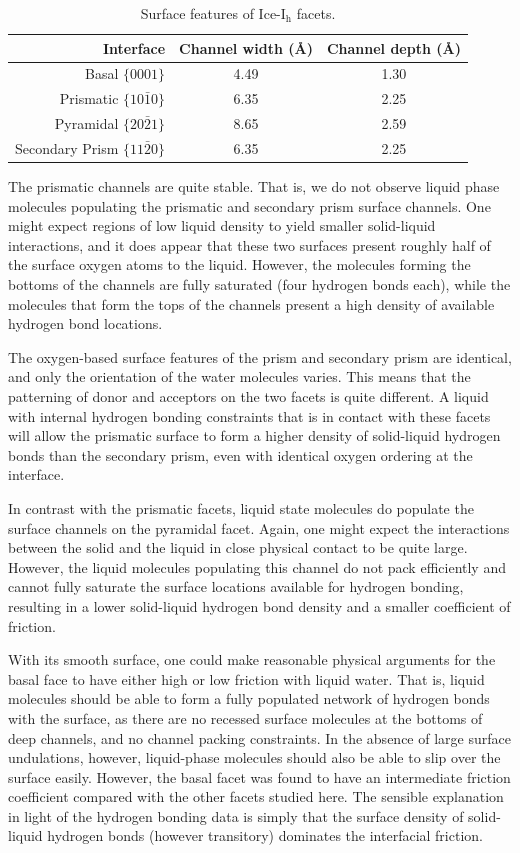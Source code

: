 \begin{table}[h]
\centering
\caption{Surface features of Ice-I$_\mathrm{h}$ facets.\label{tab:surf}}
\begin{tabular}{r|cc}  
\toprule
Interface & Channel width (\AA) & Channel depth (\AA) \\ 
\midrule
Basal  $\{0001\}$                 & 4.49 & 1.30 \\
Prismatic  $\{10\bar{1}0\}$       & 6.35 & 2.25 \\
Pyramidal  $\{20\bar{2}1\}$       & 8.65 & 2.59 \\
Secondary Prism  $\{11\bar{2}0\}$ & 6.35 & 2.25 \\ 
\bottomrule
\end{tabular}
\end{table}

The prismatic channels are quite stable. That is, we do not observe
liquid phase molecules populating the prismatic and secondary prism
surface channels. One might expect regions of low liquid density to
yield smaller solid-liquid interactions, and it does appear that these
two surfaces present roughly half of the surface oxygen atoms to the
liquid.  However, the molecules forming the bottoms of the channels
are fully saturated (four hydrogen bonds each), while the molecules
that form the tops of the channels present a high density of available
hydrogen bond locations.

The oxygen-based surface features of the prism and secondary prism are
identical, and only the orientation of the water molecules varies.
This means that the patterning of donor and acceptors on the two
facets is quite different. A liquid with internal hydrogen bonding
constraints that is in contact with these facets will allow the
prismatic surface to form a higher density of solid-liquid hydrogen
bonds than the secondary prism, even with identical oxygen ordering at
the interface.

In contrast with the prismatic facets, liquid state molecules do
populate the surface channels on the pyramidal facet. Again, one might
expect the interactions between the solid and the liquid in close
physical contact to be quite large.  However, the liquid molecules
populating this channel do not pack efficiently and cannot fully
saturate the surface locations available for hydrogen bonding,
resulting in a lower solid-liquid hydrogen bond density and a smaller
coefficient of friction.

With its smooth surface, one could make reasonable physical arguments
for the basal face to have either high or low friction with liquid
water. That is, liquid molecules should be able to form a fully
populated network of hydrogen bonds with the surface, as there are no
recessed surface molecules at the bottoms of deep channels, and no
channel packing constraints. In the absence of large surface
undulations, however, liquid-phase molecules should also be able to
slip over the surface easily. However, the basal facet was found to
have an intermediate friction coefficient compared with the other
facets studied here. The sensible explanation in light of the
hydrogen bonding data is simply that the surface density of
solid-liquid hydrogen bonds (however transitory) dominates the
interfacial friction.

